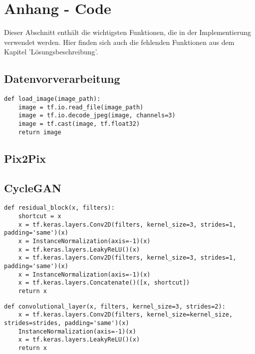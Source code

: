 \chapter{Anhang - Code}

Dieser Abschnitt enthält die wichtigsten Funktionen, die in der Implementierung verwendet werden. 
Hier finden sich auch die fehlenden Funktionen aus dem Kapitel 'Lösungsbeschreibung'.

\section*{Datenvorverarbeitung}
\begin{lstlisting}[language=pyhaff, caption={Lesen eines Bildes (CycleGAN Implementierung)}, label={cod:imageLoading}]
def load_image(image_path):
    image = tf.io.read_file(image_path)
    image = tf.io.decode_jpeg(image, channels=3)
    image = tf.cast(image, tf.float32)
    return image
\end{lstlisting}

\newpage
\section*{Pix2Pix}


\newpage
\section*{CycleGAN}
\begin{lstlisting}[language=pyhaff, caption={Residualblock Implementierung}, label={cod:residual}]
def residual_block(x, filters):
    shortcut = x
    x = tf.keras.layers.Conv2D(filters, kernel_size=3, strides=1, padding='same')(x)
    x = InstanceNormalization(axis=-1)(x)
    x = tf.keras.layers.LeakyReLU()(x)
    x = tf.keras.layers.Conv2D(filters, kernel_size=3, strides=1, padding='same')(x)
    x = InstanceNormalization(axis=-1)(x)
    x = tf.keras.layers.Concatenate()([x, shortcut])
    return x
\end{lstlisting}

\begin{lstlisting}[language=pyhaff, caption={Convolutional Block in CycleGAN}, label={cod:cycleGANConvolutional}]
def convolutional_layer(x, filters, kernel_size=3, strides=2):
    x = tf.keras.layers.Conv2D(filters, kernel_size=kernel_size, strides=strides, padding='same')(x)
    InstanceNormalization(axis=-1)(x)
    x = tf.keras.layers.LeakyReLU()(x)
    return x
\end{lstlisting}

